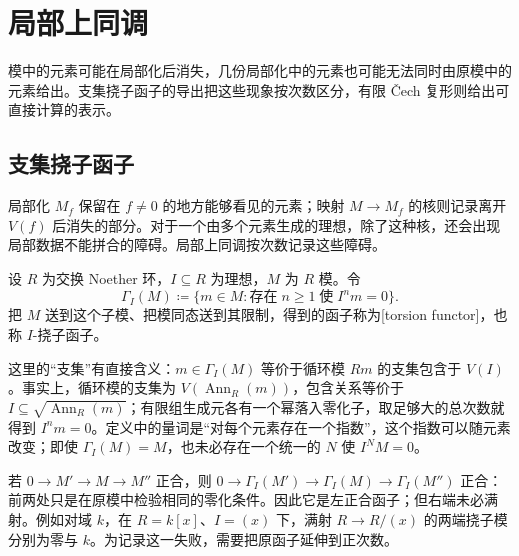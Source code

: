 
\section{局部上同调}
\label{b3:sec:2201}

模中的元素可能在局部化后消失，几份局部化中的元素也可能无法同时由原模中的元素给出。支集挠子函子的导出把这些现象按次数区分，有限 Čech 复形则给出可直接计算的表示。


%
%
%

\subsection{支集挠子函子}
\label{b3:subsec:2201:01}

局部化 \(M_f\) 保留在 \(f\ne0\) 的地方能够看见的元素；映射 \(M\to M_f\) 的核则记录离开 \(V(f)\) 后消失的部分。对于一个由多个元素生成的理想，除了这种核，还会出现局部数据不能拼合的障碍。局部上同调按次数记录这些障碍。

\begin{definition}\label{b3:def:support-torsion-functor}
	设 \(R\) 为交换 Noether 环，\(I\subseteq R\) 为理想，\(M\) 为 \(R\) 模。令
	\[
		\Gamma_I(M)\coloneqq\{m\in M:\text{存在}\;n\ge1\;\text{使}\;I^nm=0\}.
	\]
	把 \(M\) 送到这个子模、把模同态送到其限制，得到的函子称为[torsion functor]，也称 \(I\)-挠子函子。
\end{definition}

这里的“支集”有直接含义：\(m\in\Gamma_I(M)\) 等价于循环模 \(Rm\) 的支集包含于 \(V(I)\)。事实上，循环模的支集为 \(V(\operatorname{Ann}_R(m))\)，包含关系等价于 \(I\subseteq\sqrt{\operatorname{Ann}_R(m)}\)；有限组生成元各有一个幂落入零化子，取足够大的总次数就得到 \(I^nm=0\)。定义中的量词是“对每个元素存在一个指数”，这个指数可以随元素改变；即使 \(\Gamma_I(M)=M\)，也未必存在一个统一的 \(N\) 使 \(I^NM=0\)。

\ProseParagraphBreak
若 \(0\to M'\to M\to M''\) 正合，则 \(0\to\Gamma_I(M')\to\Gamma_I(M)\to\Gamma_I(M'')\) 正合：前两处只是在原模中检验相同的零化条件。因此它是左正合函子；但右端未必满射。例如对域 \(k\)，在 \(R=k[x]\)、\(I=(x)\) 下，满射 \(R\to R/(x)\) 的两端挠子模分别为零与 \(k\)。为记录这一失败，需要把原函子延伸到正次数。

